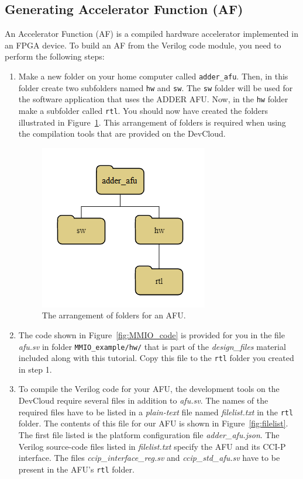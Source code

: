 \documentclass[11pt, twoside, pdftex]{article}
\begin{document}
\subsection{Generating Accelerator Function (AF)}
An Accelerator Function (AF) is a compiled hardware accelerator implemented in an FPGA device. To build an AF from the Verilog code module, you need to perform the following steps:
\begin{enumerate}
\item
Make a new folder on your home computer called \texttt{adder\_afu}. Then, in this folder create two
subfolders named \texttt{hw} and \texttt{sw}. The \texttt{sw} folder will be used for the software application that uses the ADDER AFU. Now, in the \texttt{hw} folder make a subfolder called \texttt{rtl}. You should now have created the folders illustrated in Figure~\ref{fig:folders}. This arrangement of folders is required when using the compilation tools that are provided on the DevCloud.

\begin{figure}[h]
  \begin{center}
      \includegraphics[]{figures/fig4.png}
  \end{center}
  \caption{The arrangement of folders for an AFU.}
	\label{fig:folders}
\end{figure}

\item
The code shown in Figure~\ref{fig:MMIO_code} is provided for you in the file {\it afu.sv} in folder \texttt{MMIO\_example/hw/} that is part of the {\it design\_files} material included along with this tutorial. Copy this file to the \texttt{rtl} folder you created in step 1.

\item
To compile the Verilog code for your AFU, the development tools on the DevCloud require several files in addition to {\it afu.sv}. The names of the required files have to be listed in a {\it plain-text} file named {\it filelist.txt} in the \texttt{rtl} folder. The contents of this file for our AFU is shown in Figure~\ref{fig:filelist}. The first file listed is the platform configuration file 
{\it adder\_afu.json}. The Verilog source-code files listed in {\it filelist.txt} specify the AFU and its CCI-P interface. The files {\it ccip\_interface\_reg.sv} and {\it ccip\_std\_afu.sv} have to be present in the AFU's 
\texttt{rtl} folder.


\end{enumerate}
\end{document}
